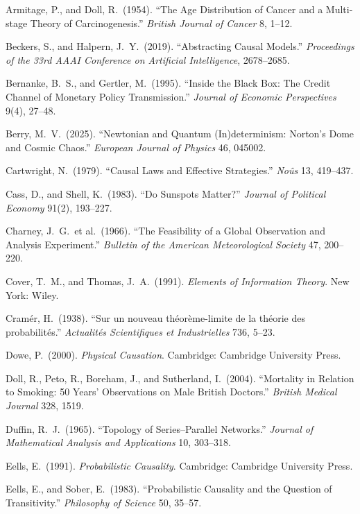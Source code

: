 \documentclass[11pt]{article}
\theoremstyle{definition}
\newenvironment{refs}{%
  \begin{list}{}{%
    \setlength{\leftmargin}{1.6em}%
    \setlength{\itemindent}{-1.6em}%
    \setlength{\itemsep}{0.35em}%
    \setlength{\parsep}{0pt}%
  }}
  {\end{list}}
\begin{document}
\begin{refs}
\item Armitage, P., and Doll, R.\ (1954). ``The Age Distribution of Cancer and a Multi-stage Theory of Carcinogenesis.'' \emph{British Journal of Cancer} 8, 1--12.
\item Beckers, S., and Halpern, J.\ Y.\ (2019). ``Abstracting Causal Models.'' \emph{Proceedings of the 33rd AAAI Conference on Artificial Intelligence}, 2678--2685.
\item Bernanke, B.\ S., and Gertler, M.\ (1995). ``Inside the Black Box: The Credit Channel of Monetary Policy Transmission.'' \emph{Journal of Economic Perspectives} 9(4), 27--48.
\item Berry, M.\ V.\ (2025). ``Newtonian and Quantum (In)determinism: Norton's Dome and Cosmic Chaos.'' \emph{European Journal of Physics} 46, 045002.
\item Cartwright, N.\ (1979). ``Causal Laws and Effective Strategies.'' \emph{No\^us} 13, 419--437.
\item Cass, D., and Shell, K.\ (1983). ``Do Sunspots Matter?'' \emph{Journal of Political Economy} 91(2), 193--227.
\item Charney, J.\ G.\ et al.\ (1966). ``The Feasibility of a Global Observation and Analysis Experiment.'' \emph{Bulletin of the American Meteorological Society} 47, 200--220.
\item Cover, T.\ M., and Thomas, J.\ A.\ (1991). \emph{Elements of Information Theory}. New York: Wiley.
\item Cram\'er, H.\ (1938). ``Sur un nouveau th\'eor\`eme-limite de la th\'eorie des probabilit\'es.'' \emph{Actualit\'es Scientifiques et Industrielles} 736, 5--23.
\item Dowe, P.\ (2000). \emph{Physical Causation}. Cambridge: Cambridge University Press.
\item Doll, R., Peto, R., Boreham, J., and Sutherland, I.\ (2004). ``Mortality in Relation to Smoking: 50 Years' Observations on Male British Doctors.'' \emph{British Medical Journal} 328, 1519.
\item Duffin, R.\ J.\ (1965). ``Topology of Series--Parallel Networks.'' \emph{Journal of Mathematical Analysis and Applications} 10, 303--318.
\item Eells, E.\ (1991). \emph{Probabilistic Causality}. Cambridge: Cambridge University Press.
\item Eells, E., and Sober, E.\ (1983). ``Probabilistic Causality and the Question of Transitivity.'' \emph{Philosophy of Science} 50, 35--57.

\end{refs}
\end{document}
